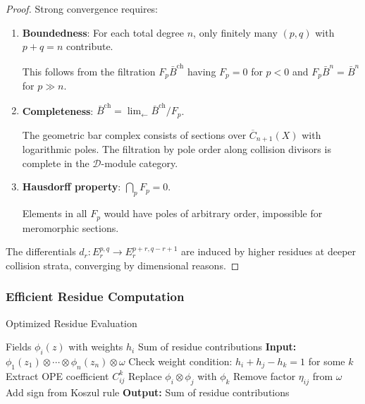 \begin{proof}
Strong convergence requires:
\begin{enumerate}
\item \textbf{Boundedness}: For each total degree $n$, only finitely many $(p,q)$ with $p+q=n$ contribute.

This follows from the filtration $F_p\bar{B}^{\text{ch}}$ having $F_p = 0$ for $p < 0$ and $F_p\bar{B}^n = \bar{B}^n$ for $p \gg n$.

\item \textbf{Completeness}: $\bar{B}^{\text{ch}} = \lim_{\leftarrow} \bar{B}^{\text{ch}}/F_p$.

The geometric bar complex consists of sections over $\overline{C}_{n+1}(X)$ with logarithmic poles. The filtration by pole order along collision divisors is complete in the $\mathcal{D}$-module category.

\item \textbf{Hausdorff property}: $\bigcap_p F_p = 0$.

Elements in all $F_p$ would have poles of arbitrary order, impossible for meromorphic sections.
\end{enumerate}

The differentials $d_r: E_r^{p,q} \to E_r^{p+r,q-r+1}$ are induced by higher residues at deeper collision strata, converging by dimensional reasons.
\end{proof}

\subsubsection{Efficient Residue Computation}
 
\begin{algorithm}[htbp]
\caption{Optimized Residue Evaluation}
\label{alg:residue-evaluation}
\begin{algorithmic}[1]
\Require Fields $\phi_i(z)$ with weights $h_i$
\Ensure Sum of residue contributions
\State \textbf{Input:} $\phi_1(z_1) \otimes \cdots \otimes \phi_n(z_n) \otimes \omega$
    \State Check weight condition: $h_i + h_j - h_k = 1$ for some $k$
        \State Extract OPE coefficient $C^k_{ij}$
        \State Replace $\phi_i \otimes \phi_j$ with $\phi_k$
        \State Remove factor $\eta_{ij}$ from $\omega$
        \State Add sign from Koszul rule
    \EndIf
\EndFor
\State \textbf{Output:} Sum of residue contributions
\end{algorithmic}
\end{algorithm}

